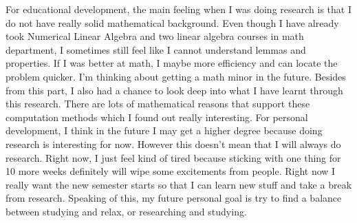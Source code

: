\documentclass{article}
\begin{document}
For educational development, the main feeling when I was doing research is that I do not have really solid mathematical background. 
Even though I have already took Numerical Linear Algebra and two linear algebra courses in math department, I sometimes still feel like I cannot understand lemmas and properties. 
If I was better at math, I maybe more efficiency and can locate the problem quicker. 
I'm thinking about getting a math minor in the future. 
Besides from this part, I also had a chance to look deep into what I have learnt through this research.
There are lots of mathematical reasons that support these computation methods which I found out really interesting.
For personal development, I think in the future I may get a higher degree because doing research is interesting for now. 
However this doesn't mean that I will always do research.
Right now, I just feel kind of tired because sticking with one thing for 10 more weeks definitely will wipe some excitements from people.
Right now I really want the new semester starts so that I can learn new stuff and take a break from research.
Speaking of this, my future personal goal is try to find a balance between studying and relax, or researching and studying.






\end{document}
